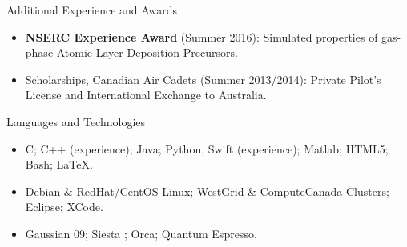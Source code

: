 \documentclass[]{mcdowellcv}
\begin{document}
	\begin{cvsection}{Additional Experience and Awards}
		\begin{cvsubsection}{}{}{}	
			\begin{itemize}
				\item \textbf{NSERC Experience Award} (Summer 2016): Simulated properties of gas-phase Atomic Layer Deposition Precursors.
				\item Scholarships, Canadian Air Cadets (Summer 2013/2014): Private Pilot's License and International Exchange to Australia. 			\end{itemize}
		\end{cvsubsection}
	\end{cvsection}
	
	\begin{cvsection}{Languages and Technologies}
		\begin{cvsubsection}{}{}{}	
			\begin{itemize}
				\item C; C++ (experience); Java; Python; Swift (experience); Matlab; HTML5; Bash; \LaTeX. 
				\item Debian \& RedHat/CentOS Linux; WestGrid \& ComputeCanada Clusters; Eclipse; XCode.
                \item Gaussian 09; Siesta ; Orca; Quantum Espresso.
			\end{itemize}
		\end{cvsubsection}
	\end{cvsection}
	
\end{document}
